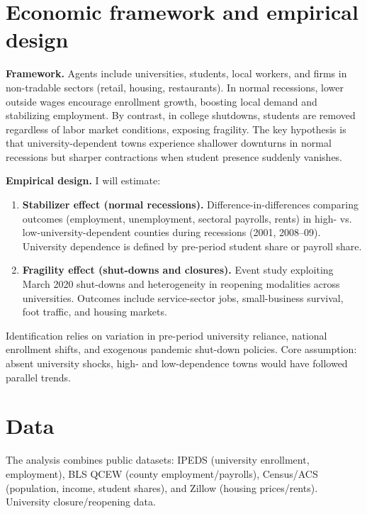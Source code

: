 \section{ Economic framework and empirical design}

\noindent \textbf{Framework.} Agents include universities, students, local workers, and firms in non-tradable sectors (retail, housing, restaurants). In normal recessions, lower outside wages encourage enrollment growth, boosting local demand and stabilizing employment. By contrast, in college shutdowns, students are removed regardless of labor market conditions, exposing fragility. The key hypothesis is that university-dependent towns experience shallower downturns in normal recessions but sharper contractions when student presence suddenly vanishes.

\noindent \textbf{Empirical design.} I will estimate:
\begin{enumerate}
	\item \textbf{Stabilizer effect (normal recessions).} Difference-in-differences comparing outcomes (employment, unemployment, sectoral payrolls, rents) in high- vs. low-university-dependent counties during recessions (2001, 2008–09). University dependence is defined by pre-period student share or payroll share.
	\item \textbf{Fragility effect (shut-downs and closures).} Event study exploiting March 2020 shut-downs and heterogeneity in reopening modalities across universities. Outcomes include service-sector jobs, small-business survival, foot traffic, and housing markets.
\end{enumerate}
Identification relies on variation in pre-period university reliance, national enrollment shifts, and exogenous pandemic shut-down policies. Core assumption: absent university shocks, high- and low-dependence towns would have followed parallel trends.

\section{ Data}
\noindent The analysis combines public datasets: IPEDS (university enrollment, employment), BLS QCEW (county employment/payrolls), Census/ACS (population, income, student shares), and Zillow (housing prices/rents). University closure/reopening data.






\singlespacing



\pagebreak
\renewcommand*{\thepage}{A.\arabic{page}}
\setcounter{page}{0}
\setcounter{equation}{0}
\renewcommand{\theequation}{A.\arabic{equation}}
\setcounter{section}{0}
\renewcommand{\thesection}{A.\arabic{section}}
\renewcommand{\thefigure}{A.\arabic{figure}}
\setcounter{figure}{0}
\renewcommand{\thetable}{A.\arabic{table}}
\setcounter{table}{0}
\thispagestyle{empty}


